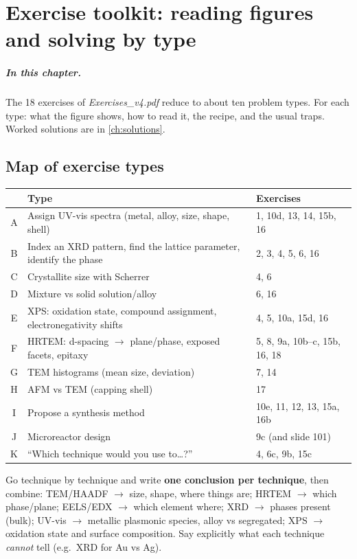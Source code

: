 \chapter{Exercise toolkit: reading figures and solving by type}
\label{ch:toolkit}

\paragraph{In this chapter.} The 18 exercises of \emph{Exercises\_v4.pdf} reduce to about ten problem types. For each type:
what the figure shows, how to read it, the recipe, and the usual traps. Worked solutions are in \cref{ch:solutions}.

\section{Map of exercise types}
\begin{center}
\renewcommand{\arraystretch}{1.25}
\begin{tabularx}{\linewidth}{@{}clX@{}}
\toprule
& Type & Exercises \\ \midrule
A & Assign UV-vis spectra (metal, alloy, size, shape, shell) & 1, 10d, 13, 14, 15b, 16 \\
B & Index an XRD pattern, find the lattice parameter, identify the phase & 2, 3, 4, 5, 6, 16 \\
C & Crystallite size with Scherrer & 4, 6 \\
D & Mixture vs solid solution/alloy & 6, 16 \\
E & XPS: oxidation state, compound assignment, electronegativity shifts & 4, 5, 10a, 15d, 16 \\
F & HRTEM: d-spacing $\to$ plane/phase, exposed facets, epitaxy & 5, 8, 9a, 10b--c, 15b, 16, 18 \\
G & TEM histograms (mean size, deviation) & 7, 14 \\
H & AFM vs TEM (capping shell) & 17 \\
I & Propose a synthesis method & 10e, 11, 12, 13, 15a, 16b \\
J & Microreactor design & 9c (and slide 101) \\
K & ``Which technique would you use to\ldots?'' & 4, 6c, 9b, 15c \\
\bottomrule
\end{tabularx}
\end{center}

\begin{tipbox}
Go technique by technique and write \textbf{one conclusion per technique}, then combine:
TEM/HAADF $\to$ size, shape, where things are; HRTEM $\to$ which phase/plane; EELS/EDX $\to$ which element where;
XRD $\to$ phases present (bulk); UV-vis $\to$ metallic plasmonic species, alloy vs segregated; XPS $\to$ oxidation
state and surface composition. Say explicitly what each technique \emph{cannot} tell (e.g.\ XRD for Au vs Ag).
\end{tipbox}

